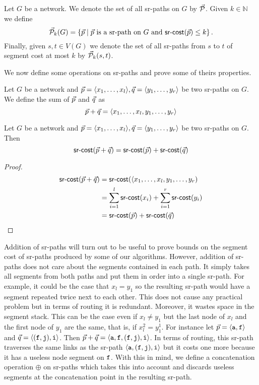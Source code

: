 \begin{definition}
Let $G$ be a network. We denote the set of all sr-paths on $G$ by $\vec{\mathcal{P}}$. Given $k \in \mathbb{N}$ we define
$$
\mathcal{\vec{P}}_k(G) = \left\{ \vec{p} \mid \text{$\vec{p}$ is a sr-path on $G$ and $\textsf{sr-cost}(\vec{p}) \leq k$} \right\}.
$$
Finally, given $s, t \in V(G)$ we denote the set of all sr-paths from $s$ to $t$ of segment cost at most $k$
by $\mathcal{\vec{P}}_k(s, t)$.

\end{definition}

We now define some operations on sr-paths and prove some of theirs properties.
 
\begin{definition}
Let $G$ be a network and $\vec{p} = \langle x_1, \ldots, x_l \rangle, \vec{q} = \langle y_1, \ldots, y_r \rangle$ be two sr-paths on $G$. We 
define the sum of $\vec{p}$ and $\vec{q}$ as
$$
\vec{p} + \vec{q} = \langle x_1, \ldots, x_l, y_1, \ldots, y_r \rangle
$$
\end{definition}

\begin{lemma}
\label{lemma:srsumcost}
Let $G$ be a network and $\vec{p} = \langle x_1, \ldots, x_l \rangle, \vec{q} = \langle y_1, \ldots, y_r \rangle$ be two sr-paths on $G$. Then
$$
\textsf{sr-cost}(\vec{p} + \vec{q}) = \textsf{sr-cost}(\vec{p}) + \textsf{sr-cost}(\vec{q}) 
$$
\end{lemma}

\begin{proof}
\begin{align*}
\textsf{sr-cost}(\vec{p} + \vec{q}) & = \textsf{sr-cost}(\langle x_1, \ldots, x_l, y_1, \ldots, y_r) \\
& = \sum_{i = 1}^l \textsf{sr-cost}(x_i) + \sum_{i = 1}^r \textsf{sr-cost}(y_i) \\
& = \textsf{sr-cost}(\vec{p}) + \textsf{sr-cost}(\vec{q})
\end{align*}
\end{proof}

Addition of sr-paths will turn out to be useful to prove
bounds on the segment cost of sr-paths produced by some of our algorithms. However, 
addition of sr-paths does not care about the segments contained in each path. It simply takes all segments
from both paths and put them in order into a single sr-path. For example, it could be the case that $x_l = y_1$
so the resulting sr-path would have a segment repeated twice next to each other. This does not 
cause any practical problem but in terms of routing it is redundant. Moreover, it wastes space in the segment stack. This can be the case even if $x_l \neq y_1$ but the last node of $x_l$ and the first node of $y_1$ 
are the same, that is, if $x^2_l = y^1_1$. For instance let $\vec{p} = \langle \texttt{a}, \texttt{f} \rangle$ and
$\vec{q} = \langle (\texttt{f}, \texttt{j}), \texttt{i} \rangle$. Then 
$\vec{p} + \vec{q} = \langle \texttt{a}, \texttt{f}, (\texttt{f}, \texttt{j}), \texttt{i} \rangle$. 
In terms of routing, this sr-path traverses the same links as the sr-path $\langle \texttt{a}, (\texttt{f}, \texttt{j}), \texttt{i} \rangle$
but it costs one more because it has a useless node segment on $\texttt{f}$.
With this in mind, we define a concatenation operation $\oplus$ on sr-paths which takes this into account and discards useless segments at the concatenation
point in the resulting sr-path.

